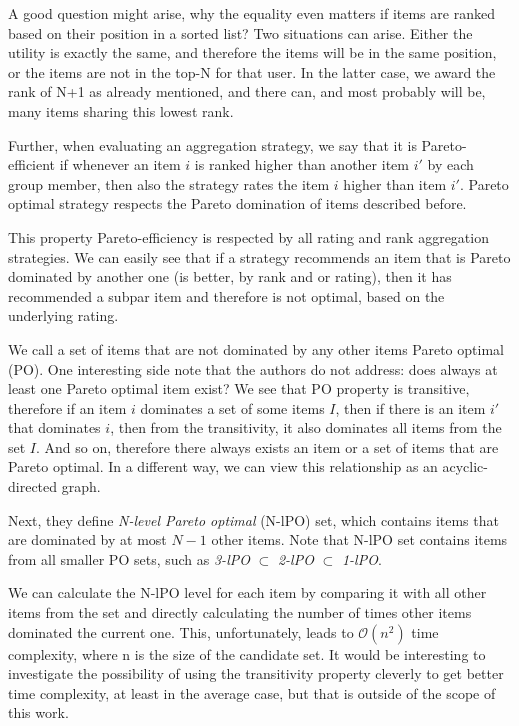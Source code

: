 A good question might arise, why the equality even matters if items are ranked based on their position in a sorted list? Two situations can arise. Either the utility is exactly the same, and therefore the items will be in the same position, or the items are not in the top-N for that user. In the latter case, we award the rank of N+1 as already mentioned, and there can, and most probably will be, many items sharing this lowest rank.

Further, when evaluating an aggregation strategy, we say that it is Pareto-efficient if whenever an item $i$ is ranked higher than another item $i'$ by each group member, then also the strategy rates the item $i$ higher than item $i'$. Pareto optimal strategy respects the Pareto domination of items described before.

This property Pareto-efficiency is respected by all rating and rank aggregation strategies. We can easily see that if a strategy recommends an item that is Pareto dominated by another one (is better, by rank and or rating), then it has recommended a subpar item and therefore is not optimal, based on the underlying rating.

We call a set of items that are not dominated by any other items Pareto optimal (PO). One interesting side note that the authors do not address: does always at least one Pareto optimal item exist? We see that PO property is transitive, therefore if an item $i$ dominates a set of some items $I$, then if there is an item $i'$ that dominates $i$, then from the transitivity, it also dominates all items from the set $I$. And so on, therefore there always exists an item or a set of items that are Pareto optimal. In a different way, we can view this relationship as an acyclic-directed graph.

Next, they define \textit{N-level Pareto optimal} (N-lPO) set, which contains items that are dominated by at most $N - 1$ other items. Note that N-lPO set contains items from all smaller PO sets, such as \textit{3-lPO} $\subset$ \textit{2-lPO} $\subset$ \textit{1-lPO}.

We can calculate the N-lPO level for each item by comparing it with all other items from the set and directly calculating the number of times other items dominated the current one. This, unfortunately, leads to $\mathcal{O}(n^2)$ time complexity, where n is the size of the candidate set. It would be interesting to investigate the possibility of using the transitivity property cleverly to get better time complexity, at least in the average case, but that is outside of the scope of this work.

